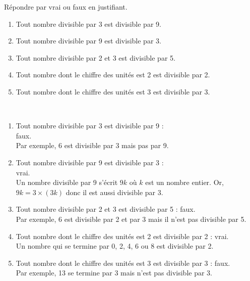 \begin{colonne*exercice}
\smallskip


\begin{exercice} %
   Répondre par vrai ou faux en justifiant.
   \begin{enumerate}
      \item Tout nombre divisible par 3 est divisible par 9.
      \item Tout nombre divisible par 9 est divisible par 3.
      \item Tout nombre divisible par 2 et 3 est divisible par 5.
      \item Tout nombre dont le chiffre des unités est 2 est divisible par 2. 
      \item Tout nombre dont le chiffre des unités est 3 est divisible par 3.
   \end{enumerate}
\end{exercice}

\begin{corrige}
   \ \\ [-5mm]
   \begin{enumerate}
      \item Tout nombre divisible par 3 est divisible par 9 : \\
         {\blue faux}. \\
         Par exemple, 6 est divisible par 3 mais pas par 9.
      \item Tout nombre divisible par 9 est divisible par 3 : \\
         {\blue vrai}. \\
         Un nombre divisible par 9 s'écrit $9k$ où $k$ est un nombre entier. Or, $9k =3\times(3k)$ donc il est aussi divisible par 3.
      \item Tout nombre divisible par 2 et 3 est divisible par 5 : {\blue faux}. \\
      Par exemple, 6 est divisible par 2 et par 3 mais il n'est pas divisible par 5.
      \item Tout nombre dont le chiffre des unités est 2 est divisible par 2 : {\blue vrai}. \\
      Un nombre qui se termine par 0, 2, 4, 6 ou 8 est divisible par 2.
      \item Tout nombre dont le chiffre des unités est 3 est divisible par 3 : {\blue faux}. \\
      Par exemple, 13 se termine par 3 mais n'est pas divisible par 3.
   \end{enumerate}
\end{corrige}

\end{colonne*exercice}


